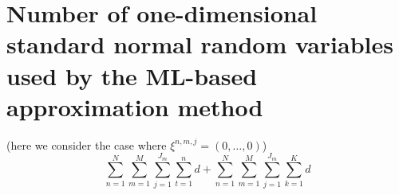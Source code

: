 \documentclass[a4paper,12pt]{article}
\providecommand{\1}{\mathbbm{1}}
\providecommand{\bV}{{\ensuremath{\mathbb{V}}}}
\newcommand{\Y}{\mathcal{Y}}
\DeclarePairedDelimiter{\pr}()
\DeclarePairedDelimiter{\br}[]
\newcommand{\bpr}[1]{\pr[\big]{#1}}
\newcommand{\bbpr}[1]{\pr[\Big]{#1}}
\newcommand{\bbbbr}[1]{\br[\bigg]{#1}}
\newcommand{\bbbbbr}[1]{\br[\Bigg]{#1}}
\begin{document}
\section{Number of one-dimensional standard normal random variables used by the ML-based approximation method}
  (here we consider the case where $\xi^{n,m,j} = (0,\dots,0)$)
  \begin{equation}
    \sum_{n=1}^N %
    \sum_{m=1}^M %
     \sum_{j=1}^{J_m} %
    \sum_{t=1}^{n} d %
    + \sum_{n=1}^N %
    \sum_{m=1}^M %
    \sum_{j=1}^{J_m} %
    \sum_{k=1}^K d %
  \end{equation}
\end{document}
